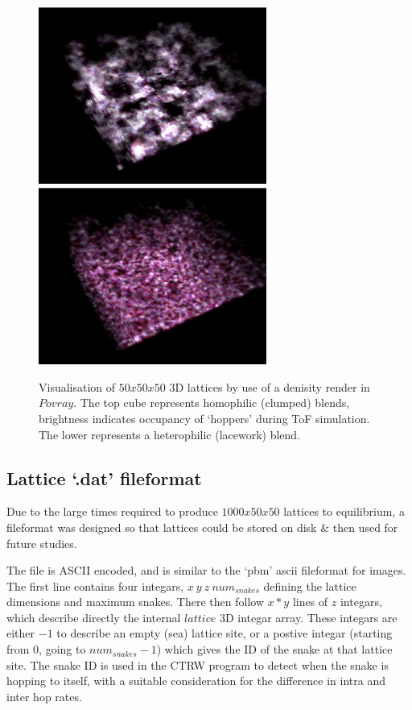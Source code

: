 \documentclass[twocolumn,a4,notitlepage]{report}
\begin{document}
\begin{figure}[htb]
\centering
\includegraphics[width=7.5cm]{figures/attractive_frame88.ps}
\medskip
\includegraphics[width=7.5cm]{figures/repulsive_frame88.ps}
\caption{Visualisation of $50x50x50$ 3D lattices by use of a denisity render
in $Povray$. The top cube represents homophilic (clumped) blends, brightness
indicates occupancy of `hoppers' during ToF simulation. The lower represents
a heterophilic (lacework) blend.}
\end{figure}

\subsection{Lattice `.dat' fileformat}

Due to the large times required to produce $1000x50x50$ lattices to
equilibrium, a fileformat was designed so that lattices could be stored on
disk \& then used for future studies.

The file is ASCII encoded, and is similar to the `pbm' ascii fileformat for
images. The first line contains four integars, $x \ y \ z \ num_{snakes}$
defining the lattice dimensions and maximum snakes. There
then follow $x * y$ lines of $z$ integars, which describe directly the
internal $lattice$ 3D integar array. These integars are either $-1$ to
describe an empty (sea) lattice site, or a postive integar (starting from
$0$, going to $num_{snakes}-1$) which gives the ID of the snake at that lattice site. The snake ID is
used in the CTRW program to detect when the snake is hopping to itself, with
a suitable consideration for the difference in intra and inter hop rates.
\end{document}
